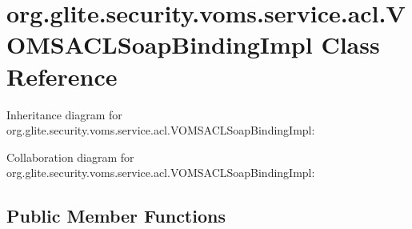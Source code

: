 \hypertarget{classorg_1_1glite_1_1security_1_1voms_1_1service_1_1acl_1_1VOMSACLSoapBindingImpl}{
\section{org.glite.security.voms.service.acl.VOMSACLSoapBindingImpl Class Reference}
\label{classorg_1_1glite_1_1security_1_1voms_1_1service_1_1acl_1_1VOMSACLSoapBindingImpl}
}


Inheritance diagram for org.glite.security.voms.service.acl.VOMSACLSoapBindingImpl:


Collaboration diagram for org.glite.security.voms.service.acl.VOMSACLSoapBindingImpl:
\subsection*{Public Member Functions}
